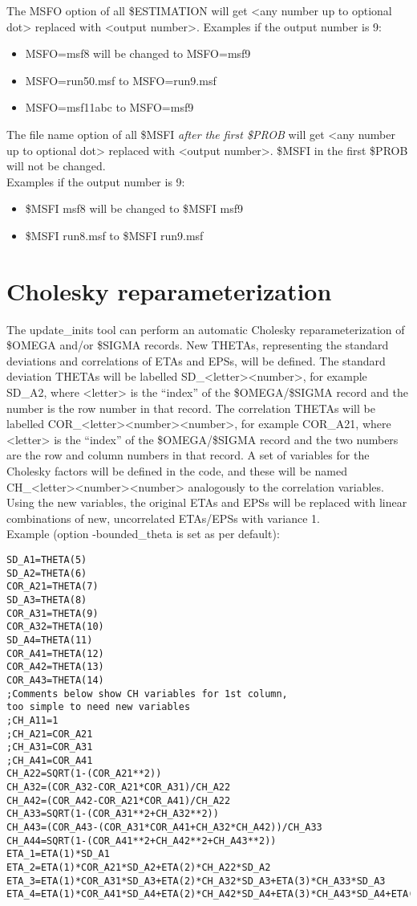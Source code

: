 \noindent The MSFO option of all \$ESTIMATION will get <any number up to optional dot> replaced with <output number>. 
Examples if the output number is 9:
\begin{itemize}
\item MSFO=msf8 will be changed to MSFO=msf9
\item MSFO=run50.msf to MSFO=run9.msf
\item MSFO=msf11abc to MSFO=msf9
\end{itemize}

\noindent The file name option of all \$MSFI \emph{after the first \$PROB} will get <any number up to optional dot> replaced with <output number>. \$MSFI in the first \$PROB will not be changed.\\
Examples if the output number is 9:
\begin{itemize}
\item \$MSFI msf8 will be changed to \$MSFI msf9
\item \$MSFI run8.msf to \$MSFI run9.msf
\end{itemize}

\section{Cholesky reparameterization}
The update\_inits tool can perform an automatic Cholesky reparameterization of \$OMEGA and/or \$SIGMA records. New THETAs, representing the standard deviations and correlations of ETAs and EPSs, will be defined. The standard deviation THETAs will be labelled SD\_<letter><number>, for example SD\_A2, where <letter> is the ``index'' of the \$OMEGA/\$SIGMA record and the number is the row number in that record. 
The correlation THETAs will be labelled COR\_<letter><number><number>, for example COR\_A21,  where <letter> is the ``index'' of the \$OMEGA/\$SIGMA record and the two numbers are the row and column numbers in that record. A set of variables for the Cholesky factors will be defined in the code, and these will be named CH\_<letter><number><number> analogously to the correlation variables.
Using the new variables, the original ETAs and EPSs will be replaced with linear combinations of new, uncorrelated ETAs/EPSs with variance 1.\\
Example (option -bounded\_theta is set as per default):

\begin{verbatim}
SD_A1=THETA(5)
SD_A2=THETA(6)
COR_A21=THETA(7)
SD_A3=THETA(8)
COR_A31=THETA(9)
COR_A32=THETA(10)
SD_A4=THETA(11)
COR_A41=THETA(12)
COR_A42=THETA(13)
COR_A43=THETA(14)
;Comments below show CH variables for 1st column,
too simple to need new variables
;CH_A11=1
;CH_A21=COR_A21
;CH_A31=COR_A31
;CH_A41=COR_A41
CH_A22=SQRT(1-(COR_A21**2))
CH_A32=(COR_A32-COR_A21*COR_A31)/CH_A22
CH_A42=(COR_A42-COR_A21*COR_A41)/CH_A22
CH_A33=SQRT(1-(COR_A31**2+CH_A32**2))
CH_A43=(COR_A43-(COR_A31*COR_A41+CH_A32*CH_A42))/CH_A33
CH_A44=SQRT(1-(COR_A41**2+CH_A42**2+CH_A43**2))
ETA_1=ETA(1)*SD_A1
ETA_2=ETA(1)*COR_A21*SD_A2+ETA(2)*CH_A22*SD_A2
ETA_3=ETA(1)*COR_A31*SD_A3+ETA(2)*CH_A32*SD_A3+ETA(3)*CH_A33*SD_A3
ETA_4=ETA(1)*COR_A41*SD_A4+ETA(2)*CH_A42*SD_A4+ETA(3)*CH_A43*SD_A4+ETA(4)*CH_A44*SD_A4

\end{verbatim}

